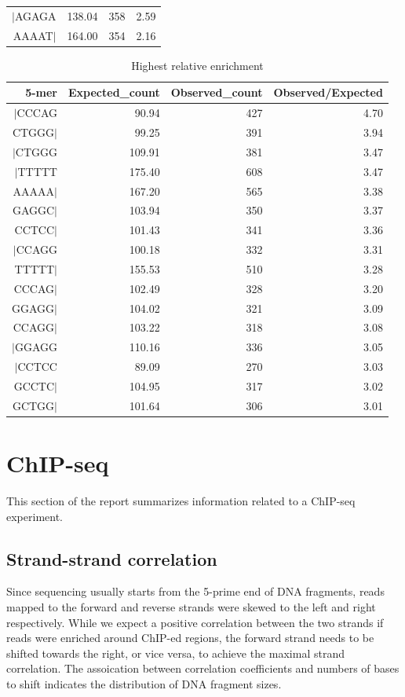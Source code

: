 \documentclass{article}
\begin{document}
\begin{center}
{\begin{longtable}{|r|r|r|r|}
  $|$AGAGA & 138.04 & 358 & 2.59 \\ 
   \rowcolor[gray]{0.9}AAAAT$|$ & 164.00 & 354 & 2.16 \\ 
   \hline
\hline
\end{longtable}
}%
{\scriptsize
\begin{longtable}{|r|r|r|r|}
\caption{Highest relative enrichment} \\ 
  \hline
5-mer & Expected\_count & Observed\_count & Observed/Expected \\ 
  \hline
$|$CCCAG &  90.94 & 427 & 4.70 \\ 
   \rowcolor[gray]{0.9}CTGGG$|$ &  99.25 & 391 & 3.94 \\ 
  $|$CTGGG & 109.91 & 381 & 3.47 \\ 
   \rowcolor[gray]{0.9}$|$TTTTT & 175.40 & 608 & 3.47 \\ 
  AAAAA$|$ & 167.20 & 565 & 3.38 \\ 
   \rowcolor[gray]{0.9}GAGGC$|$ & 103.94 & 350 & 3.37 \\ 
  CCTCC$|$ & 101.43 & 341 & 3.36 \\ 
   \rowcolor[gray]{0.9}$|$CCAGG & 100.18 & 332 & 3.31 \\ 
  TTTTT$|$ & 155.53 & 510 & 3.28 \\ 
   \rowcolor[gray]{0.9}CCCAG$|$ & 102.49 & 328 & 3.20 \\ 
  GGAGG$|$ & 104.02 & 321 & 3.09 \\ 
   \rowcolor[gray]{0.9}CCAGG$|$ & 103.22 & 318 & 3.08 \\ 
  $|$GGAGG & 110.16 & 336 & 3.05 \\ 
   \rowcolor[gray]{0.9}$|$CCTCC &  89.09 & 270 & 3.03 \\ 
  GCCTC$|$ & 104.95 & 317 & 3.02 \\ 
   \rowcolor[gray]{0.9}GCTGG$|$ & 101.64 & 306 & 3.01 \\ 
   \hline
\hline
\end{longtable}
}\end{center}
\newpage

\section{ChIP-seq}
This section of the report summarizes information related to a ChIP-seq experiment. 


\subsection{Strand-strand correlation}
Since sequencing usually starts from the 5-prime end of DNA fragments, reads mapped to the forward and reverse strands were skewed to the left and right respectively. While we expect a positive correlation between the two strands if reads were enriched around ChIP-ed regions, the forward strand needs to be shifted towards the right, or vice versa, to achieve the maximal strand correlation. The assoication between correlation coefficients and numbers of bases to shift indicates the distribution of DNA fragment sizes.
\end{document}
